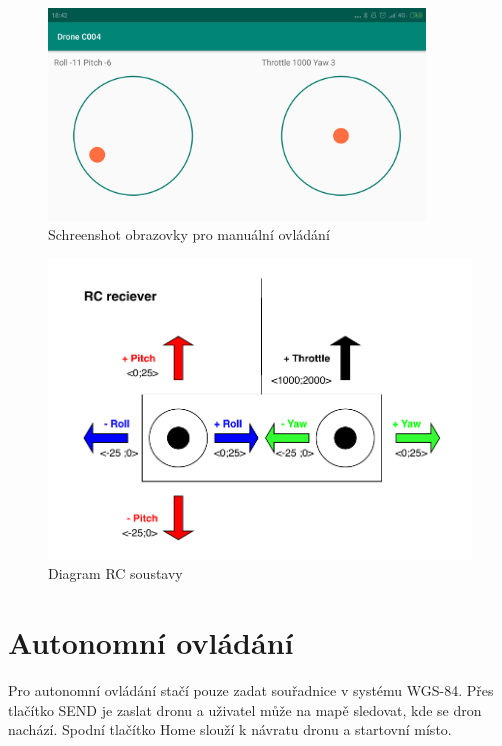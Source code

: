 \begin{figure}[h]
	\centering
	\includegraphics[width=10cm]{pictures/app.png}
	\caption{Schreenshot obrazovky pro manuální ovládání}
\end{figure}

\begin{figure}[h]
	\centering
	\includegraphics[width=14cm]{pictures/rcDiagram.pdf}
	\caption{Diagram RC soustavy}
\end{figure}

\section{Autonomní ovládání} 
Pro autonomní ovládání stačí pouze zadat souřadnice v systému WGS-84. Přes tlačítko SEND je zaslat dronu a uživatel může na mapě sledovat, kde se dron nachází. Spodní tlačítko Home slouží k návratu dronu a startovní místo.

